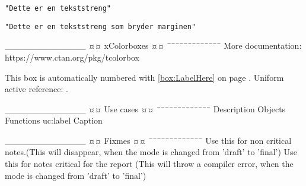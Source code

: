 \texttt{"Dette er en tekststreng"}
\begin{sloppy}
    \texttt{"Dette er en tekststreng som bryder marginen"} %
\end{sloppy}

_____________
¤¤ xColorboxes ¤¤
¯¯¯¯¯¯¯¯¯¯¯¯¯
More documentation: https://www.ctan.org/pkg/tcolorbox


This box is automatically numbered with \ref{box:LabelHere} on page
\pageref{box:LabelHere}. Uniform active reference: .

_____________
¤¤ Use cases ¤¤
¯¯¯¯¯¯¯¯¯¯¯¯¯
        {Description}
        {Objects}
        {Functions}
        {uc:label}
        {Caption}
        
_____________
¤¤ Fixmes ¤¤
¯¯¯¯¯¯¯¯¯¯¯¯¯
Use this for non critical notes.(This will disappear, when the mode is changed from 'draft' to 'final')
\fxnote{}
Use this for notes critical for the report (This will throw a compiler error, when the mode is changed from 'draft' to 'final')
\fxfatal{}